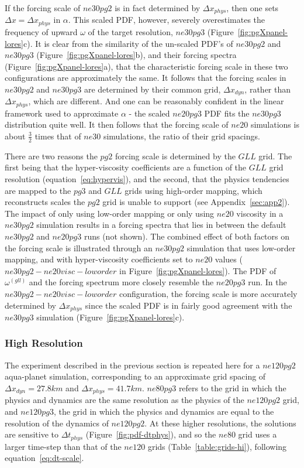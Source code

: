 \documentclass{agujournal}
\begin{document}
If the forcing scale of $ne30pg2$ is in fact determined by $\Delta x_{phys}$, then one sets $\Delta x = \Delta x_{phys}$ in $\alpha$. This scaled PDF, however, severely overestimates the frequency of upward $\omega$ of the target resolution, $ne30pg3$ (Figure~\ref{fig:pgXpanel-lores}c). It is clear from the similarity of the un-scaled PDF's of $ne30pg2$ and $ne30pg3$ (Figure~\ref{fig:pgXpanel-lores}b), and their forcing spectra (Figure~\ref{fig:pgXpanel-lores}a), that the characteristic forcing scale in these two configurations are approximately the same. It follows that the forcing scales in $ne30pg2$ and $ne30pg3$ are determined by their common grid, $\Delta x_{dyn}$, rather than $\Delta x_{phys}$, which are different. And one can be reasonably confident in the linear framework used to approximate $\alpha$ - the scaled $ne20pg3$ PDF fits the $ne30pg3$ distribution quite well. It then follows that the forcing scale of $ne20$ simulations is about $\frac{3}{2}$ times that of $ne30$ simulations, the ratio of their grid spacings.

There are two reasons the $pg2$ forcing scale is determined by the $GLL$ grid. The first being that the hyper-viscosity coefficients are a function of the $GLL$ grid resolution (equation~\eqref{eq:hypervis}), and the second, that the physics tendencies are mapped to the $pg3$ and $GLL$ grids using high-order mapping, which reconstructs scales the $pg2$ grid is unable to support (see Appendix~\ref{sec:app2}). The impact of only using low-order mapping or only using $ne20$ viscosity in a $ne30pg2$ simulation results in a forcing spectra that lies in between the default $ne30pg2$ and $ne20pg3$ runs (not shown). The combined effect of both factors on the forcing scale is illustrated through an $ne30pg2$ simulation that uses low-order mapping, and with hyper-viscosity coefficients set to $ne20$ values ($ne30pg2-ne20visc-loworder$ in Figure~\ref{fig:pgXpanel-lores}). The PDF of $\omega^{(gll)}$ and the forcing spectrum more closely resemble the $ne20pg3$ run. In the $ne30pg2-ne20visc-loworder$ configuration, the forcing scale is more accurately determined by $\Delta x_{phys}$ since the scaled PDF is in fairly good agreement with the $ne30pg3$ simulation (Figure~\ref{fig:pgXpanel-lores}c).

\subsubsection{High Resolution}\label{sec:hires}

The experiment described in the previous section is repeated here for a $ne120pg2$ aqua-planet simulation, corresponding to an approximate grid spacing of $\Delta x_{dyn} = 27.8km$ and $\Delta x_{phys} = 41.7km$. $ne80pg3$ refers to the grid in which the physics and dynamics are the same resolution as the physics of the $ne120pg2$ grid, and $ne120pg3$, the grid in which the physics and dynamics are equal to the resolution of the dynamics of $ne120pg2$. At these higher resolutions, the solutions are sensitive to $\Delta t_{phys}$ (Figure~\ref{fig:pdf-dtphys}), and so the $ne80$ grid uses a larger time-step than that of the $ne120$ grids (Table~\ref{table:grids-hi}), following equation~\eqref{eq:dt-scale}.
\end{document}
